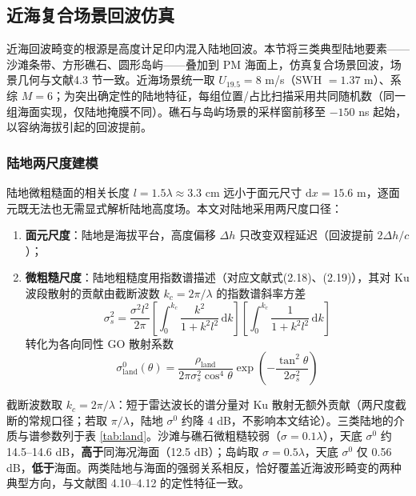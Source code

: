 \documentclass[a4paper]{article}
\newcommand{\reftab}[1]{表 \ref{#1}}
\begin{document}
\subsection{近海复合场景回波仿真}
\label{sec:coastal-sim}

近海回波畸变的根源是高度计足印内混入陆地回波。本节将三类典型陆地要素——沙滩条带、方形礁石、圆形岛屿——叠加到 PM 海面上，仿真复合场景回波，场景几何与文献\cite{refpaper}4.3 节一致。近海场景统一取 $U_{19.5} = 8$ m/s（SWH $= 1.37$ m）、系综 $M = 6$；为突出确定性的陆地特征，每组位置/占比扫描采用共同随机数（同一组海面实现，仅陆地掩膜不同）。礁石与岛屿场景的采样窗前移至 $-150$ ns 起始，以容纳海拔引起的回波提前。

\subsubsection{陆地两尺度建模}

陆地微粗糙面的相关长度 $l = 1.5 \lambda \approx 3.3$ cm 远小于面元尺寸 $\mathrm{d}x = 15.6$ m，逐面元既无法也无需显式解析陆地高度场。本文对陆地采用两尺度口径：
\begin{enumerate}
	\item \textbf{面元尺度}：陆地是海拔平台，高度偏移 $\Delta h$ 只改变双程延迟（回波提前 $2 \Delta h / c$）；
	\item \textbf{微粗糙尺度}：陆地粗糙度用指数谱描述（对应文献\cite{refpaper}式(2.18)、(2.19)），其对 Ku 波段散射的贡献由截断波数 $k_c = 2\pi/\lambda$ 的指数谱斜率方差
\begin{equation}
	\sigma_s^{2} = \frac{\sigma^{2} l^{2}}{2 \pi} \left[ \int_0^{k_c} \frac{k^{2}}{1 + k^{2} l^{2}}\, \mathrm{d}k \right] \left[ \int_0^{k_c} \frac{1}{1 + k^{2} l^{2}}\, \mathrm{d}k \right]
	\label{eq:expslope}
\end{equation}
转化为各向同性 GO 散射系数
\begin{equation}
	\sigma^0_{\mathrm{land}}(\theta) = \frac{\rho_{\mathrm{land}}}{2 \pi \sigma_s^{2} \cos^{4} \theta} \exp\!\left( -\frac{\tan^{2} \theta}{2 \sigma_s^{2}} \right)
	\label{eq:landgo}
\end{equation}
\end{enumerate}

截断波数取 $k_c = 2 \pi / \lambda$：短于雷达波长的谱分量对 Ku 散射无额外贡献（两尺度截断的常规口径；若取 $\pi/\lambda$，陆地 $\sigma^0$ 约降 4 dB，不影响本文结论）。三类陆地的介质与谱参数列于\reftab{tab:land}。沙滩与礁石微粗糙较弱（$\sigma = 0.1 \lambda$），天底 $\sigma^0$ 约 14.5--14.6 dB，\textbf{高于}同海况海面（12.5 dB）；岛屿取 $\sigma = 0.5 \lambda$，天底 $\sigma^0$ 仅 0.56 dB，\textbf{低于}海面。两类陆地与海面的强弱关系相反，恰好覆盖近海波形畸变的两种典型方向，与文献\cite{refpaper}图 4.10--4.12 的定性特征一致。
\end{document}
